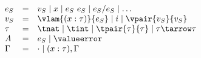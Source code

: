 {\flushleft

$\begin{array}{l c l}
  e_S & = & v_S \mid x \mid e_S~e_S \mid e_S / e_S \mid \ldots
\\
  v_S & = & \vlam{(x:\tau)}{e_S} \mid i \mid \vpair{v_S}{v_S}
\\
  \tau & = & \tnat \mid \tint \mid \tpair{\tau}{\tau} \mid \tau \tarrow \tau
\\
  A & = & e_S \mid \valueerror
\\
  \Gamma & = & \cdot \mid (x:\tau),\Gamma
\end{array}$

\smallskip
{}
\begin{mathpar}


\end{mathpar}

\smallskip
{}
\begin{mathpar}

\end{mathpar}
}
